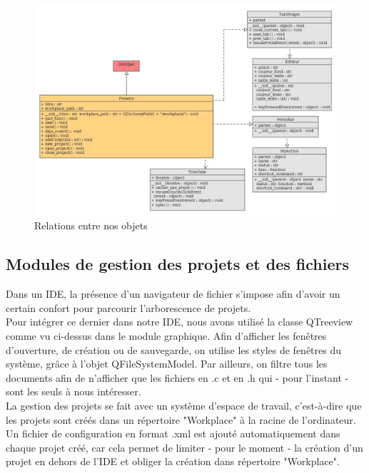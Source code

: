 \documentclass[a4paper,12pt]{article}
\begin{document}
			\begin{figure}[h!]
				\includegraphics[scale=0.4]{images/uml_module_gui_relations}
				\caption{Relations entre nos objets}
			\end{figure}
			
		\newpage			
		\subsection{Modules de gestion des projets et des fichiers}
		
		Dans un IDE, la présence d’un navigateur de fichier s’impose afin d’avoir un certain confort pour parcourir l’arborescence de projets.\\
		Pour intégrer ce dernier dans notre IDE, nous avons utilisé la classe QTreeview comme vu ci-dessus dans le module graphique. Afin d'afficher les fenêtres d'ouverture, de création ou de sauvegarde, on utilise les styles de fenêtres du système, grâce à l'objet QFileSystemModel. Par ailleurs, on filtre tous les documents afin de n'afficher que les fichiers en .c et en .h qui - pour l'instant - sont les seuls à nous intéresser.\\
		
		La gestion des projets se fait avec un système d'espace de travail, c’est-à-dire que les projets sont créés dans un répertoire "Workplace" à la racine de l’ordinateur. Un fichier de configuration en format .xml est ajouté automatiquement dans chaque projet créé, car cela permet de limiter - pour le moment - la création d’un projet en dehors de l’IDE et obliger la création dans répertoire "Workplace".\\
		
\end{document}
